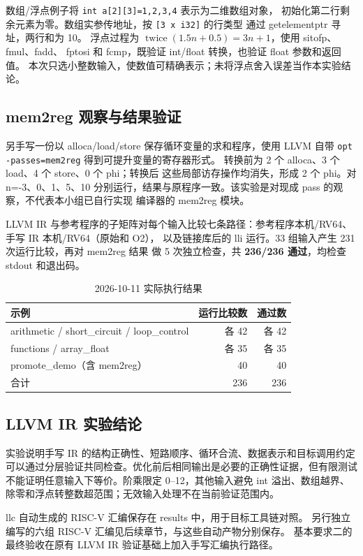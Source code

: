 \documentclass[UTF8,a4paper,11pt]{ctexart}
\begin{document}
数组/浮点例子将 \texttt{int a[2][3]={{1,2,3},{4}}} 表示为二维数组对象，
初始化第二行剩余元素为零。数组实参传地址，按 \texttt{[3 x i32]} 的行类型
通过 getelementptr 寻址，两行和为 10。
浮点过程为 $\operatorname{twice}(1.5n+0.5)=3n+1$，使用 sitofp、fmul、fadd、
fptosi 和 fcmp，既验证 int/float 转换，也验证 float 参数和返回值。
本次只选小整数输入，使数值可精确表示；未将浮点舍入误差当作本实验结论。

\subsection{mem2reg 观察与结果验证}
另手写一份以 alloca/load/store 保存循环变量的求和程序，使用 LLVM 自带
\texttt{opt -passes=mem2reg} 得到可提升变量的寄存器形式。
转换前为 2 个 alloca、3 个 load、4 个 store、0 个 phi；转换后
这些局部访存操作均消失，形成 2 个 phi。对 n=-3、0、1、5、10
分别运行，结果与原程序一致。该实验是对现成 pass 的观察，不代表本小组已自行实现
编译器的 mem2reg 模块。

LLVM IR 与参考程序的子矩阵对每个输入比较七条路径：参考程序本机/RV64、手写 IR 本机/RV64（原始和 O2），
以及链接库后的 lli 运行。33 组输入产生 231 次运行比较，再对 mem2reg 结果
做 5 次独立检查，共 \textbf{236/236 通过}，均检查 stdout 和退出码。

\begin{table}[htbp]
\centering\small
\begin{tabular}{lrr}
\toprule
示例 & 运行比较数 & 通过数\\
\midrule
arithmetic / short\_circuit / loop\_control & 各 42 & 各 42\\
functions / array\_float & 各 35 & 各 35\\
promote\_demo（含 mem2reg） & 40 & 40\\
\midrule
合计 & 236 & 236\\
\bottomrule
\end{tabular}
\caption{2026-10-11 实际执行结果}
\end{table}

\subsection{LLVM IR 实验结论}
实验说明手写 IR 的结构正确性、短路顺序、循环合流、数据表示和目标调用约定
可以通过分层验证共同检查。优化前后相同输出是必要的正确性证据，但有限测试
不能证明任意输入下等价。阶乘限定 0--12，其他输入避免 int 溢出、数组越界、
除零和浮点转整数超范围；无效输入处理不在当前验证范围内。

llc 自动生成的 RISC-V 汇编保存在 results 中，用于目标工具链对照。
另行独立编写的六组 RISC-V 汇编见后续章节，与这些自动产物分别保存。
基本要求二的最终验收在原有 LLVM IR 验证基础上加入手写汇编执行路径。
\end{document}
